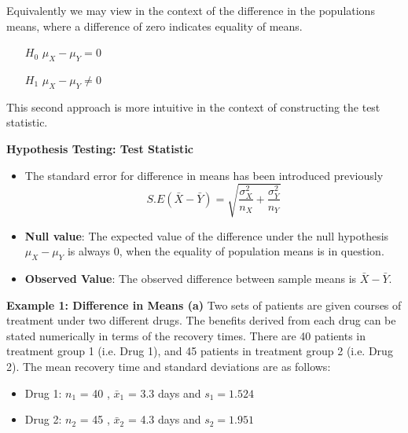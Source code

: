 \documentclass[a4]{beamer}
\begin{document}
Equivalently we may view in the context of the difference in the populations means, where a difference of zero indicates equality of means.
\begin{itemize}
\item[$H_0$] $\mu_X - \mu_Y = 0$
\item[$H_1$] $\mu_X - \mu_Y \neq 0$
\end{itemize}
This second approach is more intuitive in the context of constructing the test statistic.



\noindent \textbf{Hypothesis Testing: Test Statistic}

\begin{itemize}
\item The standard error for difference in means has been introduced previously
\[ S.E(\bar{X} - \bar{Y}) = \sqrt{\frac{\sigma^2_X}{n_X} + \frac{\sigma^2_Y}{n_Y}} \]
\item \textbf{Null value}: The expected value of the difference under the null hypothesis $\mu_X - \mu_Y$ is always 0, when the equality of population means is in question.
\item \textbf{Observed Value}: The observed difference between sample means is $\bar{X} - \bar{Y}$.
\end{itemize}







\noindent \textbf{Example 1: Difference in Means (a) }
Two sets of patients are given courses of treatment under two different drugs. The benefits
derived from each drug can be stated numerically in terms of the recovery times. There are 40 patients in treatment group 1 (i.e. Drug 1), and 45 patients in treatment group 2 (i.e. Drug 2). The mean recovery time and standard deviations are as follows:
\begin{itemize}
\item Drug 1:  $n_1$ = 40 , $\bar{x}_1$ = 3.3 days and $s_1 = 1.524$
\item Drug 2:  $n_2$ = 45 , $\bar{x}_2$ = 4.3 days and $s_2 = 1.951 $
\end{itemize}


\end{document}
